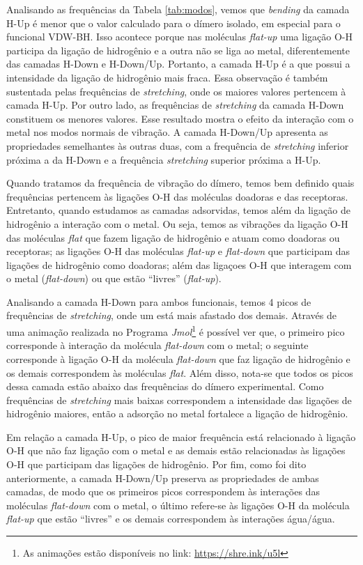 Analisando as frequências da Tabela \ref{tab:modos}, vemos que \textit{bending} da camada H-Up é menor que o valor calculado para o dímero isolado, em especial para o funcional VDW-BH. Isso acontece porque nas moléculas \textit{flat-up} uma ligação O-H participa da ligação de hidrogênio e a outra não se liga ao metal, diferentemente das camadas H-Down e H-Down/Up. Portanto, a camada H-Up é a que possui a intensidade da ligação de hidrogênio mais fraca. Essa observação é também sustentada pelas frequências de \textit{stretching}, onde os maiores valores pertencem à camada H-Up. Por outro lado, as frequências de \textit{stretching} da camada H-Down constituem os menores valores. Esse resultado mostra o efeito da interação com o metal nos modos normais de vibração. A camada H-Down/Up apresenta as propriedades semelhantes às outras duas, com a frequência de \textit{stretching} inferior próxima a da H-Down e a frequência \textit{stretching} superior próxima a H-Up. 

Quando tratamos da frequência de vibração do dímero, temos bem definido quais frequências pertencem às ligações O-H das moléculas doadoras e das receptoras. Entretanto, quando estudamos as camadas adsorvidas, temos além da ligação de hidrogênio a interação com o metal. Ou seja, temos as vibrações da ligação O-H das moléculas \textit{flat} que fazem ligação de hidrogênio e atuam como doadoras ou receptoras; as ligações O-H das  moléculas \textit{flat-up} e \textit{flat-down} que participam das ligações de hidrogênio como doadoras; além das ligaçoes O-H que interagem com o metal (\textit{flat-down}) ou que estão ``livres'' (\textit{flat-up}). 

Analisando a camada H-Down para ambos funcionais, temos 4 picos de frequências de \textit{stretching}, onde um está mais afastado dos demais. Através de uma animação realizada no Programa \textit{Jmol}\footnote{As animações estão disponíveis no link: \url{https://shre.ink/u5l}} é possível ver que, o primeiro pico corresponde à interação da molécula \textit{flat-down} com o metal; o seguinte corresponde à ligação O-H da molécula \textit{flat-down} que faz ligação de hidrogênio e os demais correspondem às moléculas \textit{flat}. Além disso, nota-se que todos os picos dessa camada estão abaixo das frequências do dímero experimental. Como frequências de \textit{stretching} mais baixas correspondem a intensidade das ligações de hidrogênio maiores, então a adsorção no metal fortalece a ligação de hidrogênio. 

Em relação a camada H-Up, o pico de maior frequência está relacionado à ligação O-H que não faz ligação com o metal e as demais estão relacionadas às ligações O-H que participam das ligações de hidrogênio. Por fim, como foi dito anteriormente, a camada H-Down/Up preserva as propriedades de ambas camadas, de modo que os primeiros picos correspondem às interações das moléculas \textit{flat-down} com o metal, o último refere-se às ligações O-H da molécula \textit{flat-up} que estão ``livres'' e os demais correspondem às interações água/água.



